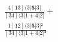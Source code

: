 \documentclass[varwidth, border=5pt]{standalone}
\begin{document}
\begin{my}
$\begin{gathered}
\scriptscriptstyle\frac{4[13]⟨3|𝟓|3]}{[34]⟨3|1+4|2]} +\\
\scriptscriptstyle\frac{1[12]⟨3|𝟓|3]²}{[34]⟨3|1+4|2]²} \phantom{+}
\end{gathered}$
\end{my}
\end{document}
